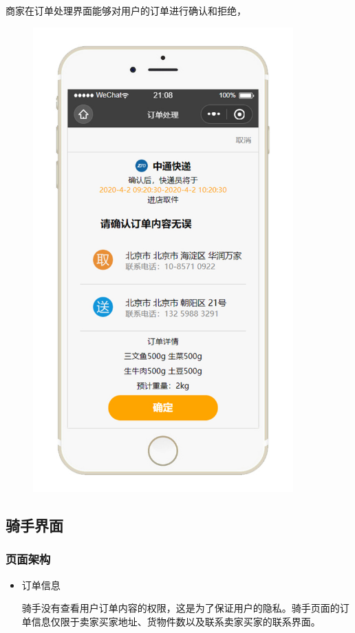 \documentclass[UTF8,12pt]{ctexart}
\numberwithin{figure}{section}%
\begin{document}
\begin{spacing}{2}
\begin{itemize}
	商家在订单处理界面能够对用户的订单进行确认和拒绝，
	\begin{figure}[!htb]
		\centering
		\includegraphics[width=10cm]{fig/!7}
	\end{figure}
	
\end{itemize}


\subsection{骑手界面}

\subsubsection{页面架构}

\begin{itemize}
	\item 订单信息
	
	骑手没有查看用户订单内容的权限，这是为了保证用户的隐私。骑手页面的订单信息仅限于卖家买家地址、货物件数以及联系卖家买家的联系界面。
	

\end{itemize}
\end{spacing}
\end{document}
